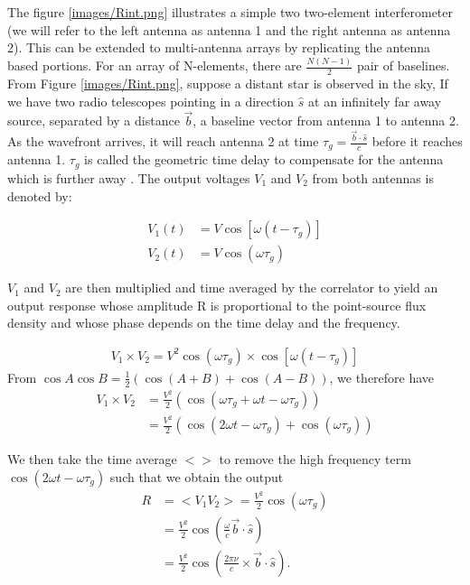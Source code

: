 The figure \ref{images/Rint.png} illustrates a simple two two-element interferometer (we will refer to the left antenna as antenna 1 and the right antenna as antenna 2). This can be extended to multi-antenna arrays by replicating the antenna based portions. For an array of N-elements, there are $\frac{N(N-1)}{2}$ pair of baselines\citep{zensus1995very}. From Figure \ref{images/Rint.png}, suppose a distant star is observed in the sky, If we have two radio telescopes pointing in a direction $\widehat{s}$ at an infinitely far away source, separated by a distance $\overrightarrow{b}$, a  baseline vector from antenna 1 to antenna 2. As the wavefront arrives, it will reach antenna 2 at time $\tau_{g}=\frac{\overrightarrow{b}\cdot\widehat{s}}{c}$ before it reaches antenna 1. $\tau_{g}$ is called the geometric time delay to compensate for the antenna which is further away \citep{taylor1999synthesis}. The output voltages $V_1$ and $V_2$ from both antennas is  denoted by: 

\begin{equation}\label{eq111}
\begin{split}
V_1(t)&=V\cos[\omega(t-\tau_{g})] \\
V_2(t)&=V\cos(\omega\tau_{g})
\end{split}
\end{equation}

$V_1$ and $V_2$ are then  multiplied and time averaged by the correlator to yield an output response whose amplitude R is proportional to the point-source flux density and whose phase depends on the time delay and the frequency.

\begin{align}
V_1 \times V_2 = V^2 \cos(\omega\tau_{g})\times \cos[\omega(t-\tau_{g})]
\end{align}
From $\cos A\cos B= \frac{1}{2} \left(\cos (A+B) + \cos (A-B) \right)$, 
we therefore have 
\begin{align*}
V_1 \times V_2&= \frac{V^2}{2} \left( \cos(\omega\tau_{g} + \omega t-\omega \tau_{g} )\right)\\
&= \frac{V^2}{2} \left(\cos(2\omega t - \omega \tau_{g}) + \cos (\omega\tau_{g})\right)
\end{align*}

We then take the time average $<>$ to remove the high frequency term $\cos(2\omega t - \omega \tau_{g})$ such that we obtain the output 
\begin{align}
R&= <V_1V_2> = \frac{V^2}{2}  \cos (\omega\tau_{g})\\
  &= \frac{V^2}{2}  \cos \left( \frac{\omega}{c} \overrightarrow{b} \cdot \widehat{s} \right)\\
   &= \frac{V^2}{2}  \cos \left( \frac{2\pi \nu}{c} \times
   \overrightarrow{b} \cdot \widehat{s} \right). 
\end{align}

